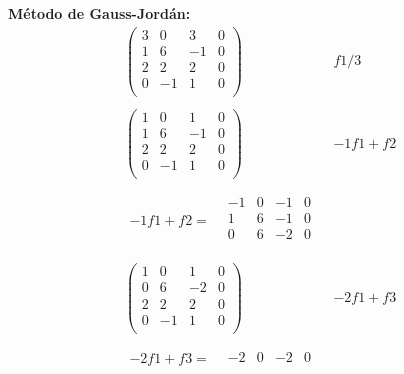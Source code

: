 \textbf{Método de Gauss-Jordán:}
\[
    \begin{aligned}
        \left(
            \begin{array}{ccc|c}
                3 & 0 & 3 & 0 \\
                1 & 6 & -1 & 0 \\
                2 & 2 & 2 & 0 \\
                0 & -1 & 1 & 0 \\
            \end{array}
        \right)
        &f1/3 \\ \\
        \left(
            \begin{array}{ccc|c}
                1 & 0 & 1 & 0 \\
                1 & 6 & -1 & 0 \\
                2 & 2 & 2 & 0 \\
                0 & -1 & 1 & 0 \\
            \end{array}
        \right)
        &-1f1+f2 \\ \\
        \begin{aligned}
            -1f1+f2=
            &\begin{array}{ccc|c}
                -1 & 0 & -1 & 0 \\
                1 & 6 & -1 & 0 \\
                \hline
                0 & 6 & -2 & 0 \\
            \end{array}
        \end{aligned} \\ \\
        \left(
            \begin{array}{ccc|c}
                1 & 0 & 1 & 0 \\
                0 & 6 & -2 & 0 \\
                2 & 2 & 2 & 0 \\
                0 & -1 & 1 & 0 \\
            \end{array}
        \right)
        &-2f1+f3 \\ \\
        \begin{aligned}
            -2f1+f3=
            &\begin{array}{ccc|c}
                -2 & 0 & -2 & 0 \\

\end{array}
\end{aligned}
\end{aligned}\]
